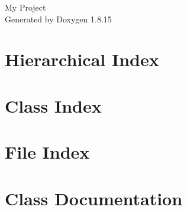 \let\mypdfximage\pdfximage\def\pdfximage{\immediate\mypdfximage}\documentclass[twoside]{book}
\newcommand{\+}{\discretionary{\mbox{\scriptsize$\hookleftarrow$}}{}{}}
\newcommand{\clearemptydoublepage}{%
  \newpage{\pagestyle{empty}\cleardoublepage}%
}
\begin{document}
\hypersetup{pageanchor=false,
             bookmarksnumbered=true,
             pdfencoding=unicode
            }
\begin{titlepage}
\vspace*{7cm}
\begin{center}%
{\Large My Project }\\
\vspace*{1cm}
{\large Generated by Doxygen 1.8.15}\\
\end{center}
\end{titlepage}
\clearemptydoublepage
{}
\tableofcontents
\clearemptydoublepage
{}
\hypersetup{pageanchor=true}

\chapter{Hierarchical Index}

\chapter{Class Index}

\chapter{File Index}

\chapter{Class Documentation}


































\end{document}
